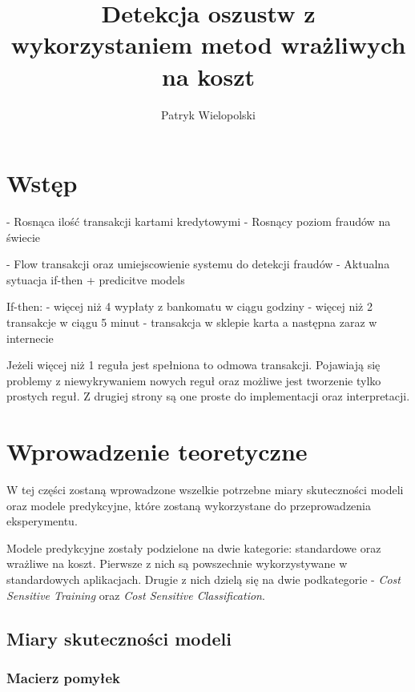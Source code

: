 \documentclass{book}
\title{Detekcja oszustw z wykorzystaniem metod wrażliwych na koszt}
\author{Patryk Wielopolski}
\begin{document}
	
	\newcommand{\htx}{h_{\theta}(\boldsymbol{x_i})}
	
	\newenvironment{talign}
	{\align}
	{\endalign}
	
	\newenvironment{talign*}
	{\csname align*\endcsname}
	{\endalign}

\maketitle

\chapter{Wstęp}
	- Rosnąca ilość transakcji kartami kredytowymi
	- Rosnący poziom fraudów na świecie
	
	- Flow transakcji oraz umiejscowienie systemu do detekcji fraudów
	- Aktualna sytuacja if-then + predicitve models
	
	If-then:
	- więcej niż 4 wypłaty z bankomatu w ciągu godziny
	- więcej niż 2 transakcje w ciągu 5 minut
	- transakcja w sklepie karta a następna zaraz w internecie
	
	Jeżeli więcej niż 1 reguła jest spełniona to odmowa transakcji. Pojawiają się problemy z niewykrywaniem nowych reguł oraz możliwe jest tworzenie tylko prostych reguł. Z drugiej strony są one proste do implementacji oraz interpretacji.
	

\chapter{Wprowadzenie teoretyczne}

W tej części zostaną wprowadzone wszelkie potrzebne miary skuteczności modeli oraz modele predykcyjne, które zostaną wykorzystane do przeprowadzenia eksperymentu. 

Modele predykcyjne zostały podzielone na dwie kategorie: standardowe oraz wrażliwe na koszt. Pierwsze z nich są powszechnie wykorzystywane w standardowych aplikacjach. Drugie z nich dzielą się na dwie podkategorie - \textit{Cost Sensitive Training} oraz \textit{Cost Sensitive Classification}.

\section{Miary skuteczności modeli}

\subsection{Macierz pomyłek}
\end{document}

